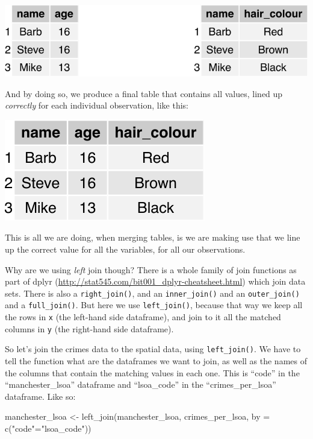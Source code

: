 \documentclass[
  krantz2]{krantz}
\makeatletter
\newenvironment{Shaded}{\begin{snugshade}}{\end{snugshade}}
\newcommand{\AttributeTok}[1]{\textcolor[rgb]{0.61,0.61,0.61}{#1}}
\newcommand{\FunctionTok}[1]{\textcolor[rgb]{0,0,0}{#1}}
\newcommand{\NormalTok}[1]{#1}
\newcommand{\OtherTok}[1]{\textcolor[rgb]{0.37,0.37,0.37}{#1}}
\newcommand{\StringTok}[1]{\textcolor[rgb]{0.5,0.5,0.5}{#1}}
\newenvironment{kframe}{%
\medskip{}
\setlength{\fboxsep}{.8em}
 \def\at@end@of@kframe{}%
 \ifinner\ifhmode%
  \def\at@end@of@kframe{\end{minipage}}%
  \begin{minipage}{\columnwidth}%
 \fi\fi%
 \def\FrameCommand##1{\hskip\@totalleftmargin \hskip-\fboxsep
 \colorbox{shadecolor}{##1}\hskip-\fboxsep
     \hskip-\linewidth \hskip-\@totalleftmargin \hskip\columnwidth}%
 \MakeFramed {\advance\hsize-\width
   \@totalleftmargin\z@ \linewidth\hsize
   \@setminipage}}%
 {\par\unskip\endMakeFramed%
 \at@end@of@kframe}
\renewenvironment{Shaded}{\begin{kframe}}{\end{kframe}}
\makeatother
\begin{document}
\includegraphics{crime_mapping_files/figure-latex/unnamed-chunk-26-1.pdf}

And by doing so, we produce a final table that contains all values, lined up \emph{correctly} for each individual observation, like this:

\includegraphics{crime_mapping_files/figure-latex/unnamed-chunk-27-1.pdf}

This is all we are doing, when merging tables, is we are making use that we line up the correct value for all the variables, for all our observations.

Why are we using \emph{left} join though? There is a whole family of join functions as part of dplyr (\url{http://stat545.com/bit001_dplyr-cheatsheet.html}) which join data sets. There is also a \texttt{right\_join()}, and an \texttt{inner\_join()} and an \texttt{outer\_join()} and a \texttt{full\_join()}. But here we use \texttt{left\_join()}, because that way we keep all the rows in \texttt{x} (the left-hand side dataframe), and join to it all the matched columns in \texttt{y} (the right-hand side dataframe).

So let's join the crimes data to the spatial data, using \texttt{left\_join()}. We have to tell the function what are the dataframes we want to join, as well as the names of the columns that contain the matching values in each one. This is ``code'' in the ``manchester\_lsoa'' dataframe and ``lsoa\_code'' in the ``crimes\_per\_lsoa'' dataframe. Like so:

\begin{Shaded}
\begin{Highlighting}[]
\NormalTok{manchester\_lsoa }\OtherTok{\textless{}{-}} \FunctionTok{left\_join}\NormalTok{(manchester\_lsoa, crimes\_per\_lsoa, }
                             \AttributeTok{by =} \FunctionTok{c}\NormalTok{(}\StringTok{"code"}\OtherTok{=}\StringTok{"lsoa\_code"}\NormalTok{))}
\end{Highlighting}
\end{Shaded}
\end{document}
